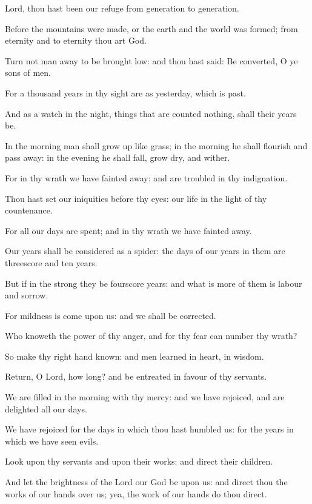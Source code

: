 ﻿\item Lord, thou hast been our refuge from generation to generation.
\item Before the mountains were made, or the earth and the world was formed; from eternity and to eternity thou art God.
\item Turn not man away to be brought low: and thou hast said: Be converted, O ye sons of men.
\item For a thousand years in thy sight are as yesterday, which is past.
\item And as a watch in the night, things that are counted nothing, shall their years be.
\item In the morning man shall grow up like grass; in the morning he shall flourish and pass away: in the evening he shall fall, grow dry, and wither.
\item For in thy wrath we have fainted away: and are troubled in thy indignation.
\item Thou hast set our iniquities before thy eyes: our life in the light of thy countenance.
\item For all our days are spent; and in thy wrath we have fainted away.
\item Our years shall be considered as a spider: the days of our years in them are threescore and ten years.
\item But if in the strong they be fourscore years: and what is more of them is labour and sorrow.
\item For mildness is come upon us: and we shall be corrected.
\item Who knoweth the power of thy anger, and for thy fear can number thy wrath?
\item So make thy right hand known: and men learned in heart, in wisdom.
\item Return, O Lord, how long? and be entreated in favour of thy servants.
\item We are filled in the morning with thy mercy: and we have rejoiced, and are delighted all our days.
\item We have rejoiced for the days in which thou hast humbled us: for the years in which we have seen evils.
\item Look upon thy servants and upon their works: and direct their children.
\item And let the brightness of the Lord our God be upon us: and direct thou the works of our hands over us; yea, the work of our hands do thou direct.
